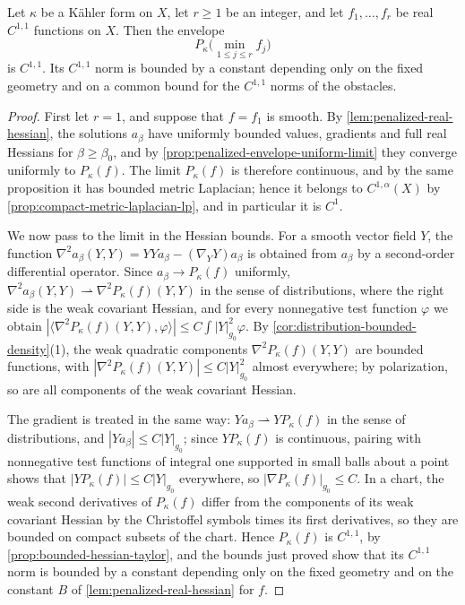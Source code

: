 \begin{theorem}\label{thm:kahler-real-c11-envelope}
Let $\kappa$ be a K\"ahler form on $X$, let $r\geq1$ be an integer, and let $f_1,\ldots,f_r$ be real $C^{1,1}$ functions on $X$. Then the envelope
\[
 P_\kappa\bigl(\min_{1\leq j\leq r}f_j\bigr)
\]
is $C^{1,1}$. Its $C^{1,1}$ norm is bounded by a constant depending only on the fixed geometry and on a common bound for the $C^{1,1}$ norms of the obstacles.
\end{theorem}
\begin{proof}
First let $r=1$, and suppose that $f=f_1$ is smooth. By \cref{lem:penalized-real-hessian}, the solutions $a_\beta$ have uniformly bounded values, gradients and full real Hessians for $\beta\geq\beta_0$, and by \cref{prop:penalized-envelope-uniform-limit} they converge uniformly to $P_\kappa(f)$. The limit $P_\kappa(f)$ is therefore continuous, and by the same proposition it has bounded metric Laplacian; hence it belongs to $C^{1,\alpha}(X)$ by \cref{prop:compact-metric-laplacian-lp}, and in particular it is $C^1$.

We now pass to the limit in the Hessian bounds. For a smooth vector field $Y$, the function $\nabla^2a_\beta(Y,Y)=YYa_\beta-(\nabla_YY)a_\beta$ is obtained from $a_\beta$ by a second-order differential operator. Since $a_\beta\to P_\kappa(f)$ uniformly, $\nabla^2a_\beta(Y,Y)\rightharpoonup\nabla^2P_\kappa(f)(Y,Y)$ in the sense of distributions, where the right side is the weak covariant Hessian, and for every nonnegative test function $\varphi$ we obtain $|\langle\nabla^2P_\kappa(f)(Y,Y),\varphi\rangle|\leq C\int|Y|_{g_0}^2\varphi$. By \cref{cor:distribution-bounded-density}(1), the weak quadratic components $\nabla^2P_\kappa(f)(Y,Y)$ are bounded functions, with $|\nabla^2P_\kappa(f)(Y,Y)|\leq C|Y|_{g_0}^2$ almost everywhere; by polarization, so are all components of the weak covariant Hessian.

The gradient is treated in the same way: $Ya_\beta\rightharpoonup YP_\kappa(f)$ in the sense of distributions, and $|Ya_\beta|\leq C|Y|_{g_0}$; since $YP_\kappa(f)$ is continuous, pairing with nonnegative test functions of integral one supported in small balls about a point shows that $|YP_\kappa(f)|\leq C|Y|_{g_0}$ everywhere, so $|\nabla P_\kappa(f)|_{g_0}\leq C$. In a chart, the weak second derivatives of $P_\kappa(f)$ differ from the components of its weak covariant Hessian by the Christoffel symbols times its first derivatives, so they are bounded on compact subsets of the chart. Hence $P_\kappa(f)$ is $C^{1,1}$, by \cref{prop:bounded-hessian-taylor}, and the bounds just proved show that its $C^{1,1}$ norm is bounded by a constant depending only on the fixed geometry and on the constant $B$ of \cref{lem:penalized-real-hessian} for $f$.


\end{proof}
